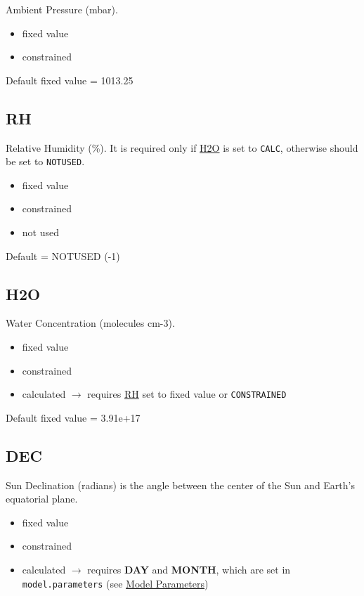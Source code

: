 Ambient Pressure (mbar).

\begin{itemize}
\item fixed value
\item constrained
\end{itemize}

Default fixed value = 1013.25

\subsection{RH} \label{subsec:rh}

Relative Humidity (\%). It is required only if
\hyperref[subsec:h2o]{H2O} is set to \texttt{CALC}, otherwise should
be set to \texttt{NOTUSED}.

\begin{itemize}
\item fixed value
\item constrained
\item not used
\end{itemize}

Default = NOTUSED (-1)

\subsection{H2O} \label{subsec:h2o}

Water Concentration (molecules cm-3).

\begin{itemize}
\item fixed value
\item constrained
\item calculated $\rightarrow$ requires \hyperref[subsec:rh]{RH} set
  to fixed value or \texttt{CONSTRAINED}
\end{itemize}

Default fixed value = 3.91e+17

\subsection{DEC} \label{subsec:dec}

Sun Declination (radians) is the angle between the center of the Sun
and Earth's equatorial plane.

\begin{itemize}
\item fixed value
\item constrained
\item calculated $\rightarrow$ requires \textbf{DAY} and
  \textbf{MONTH}, which are set in \texttt{model.parameters} (see
  \hyperref[sec:model-parameters]{Model Parameters})
\end{itemize}

